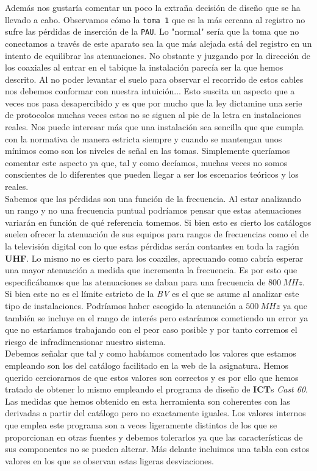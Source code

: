 \documentclass{article}[12 pt]
\begin{document}
			Además nos gustaría comentar un poco la extraña decisión de diseño que se ha llevado a cabo. Observamos cómo la \texttt{toma 1} que es la más cercana al registro no sufre las pérdidas de inserción de la \texttt{PAU}. Lo "normal" sería que la toma que no conectamos a través de este aparato sea la que más alejada está del registro en un intento de equilibrar las atenuaciones. No obstante y juzgando por la dirección de los coaxiales al entrar en el tabique la instalación parecía ser la que hemos descrito. Al no poder levantar el suelo para observar el recorrido de estos cables nos debemos conformar con nuestra intuición... Esto suscita un aspecto que a veces nos pasa desapercibido y es que por mucho que la ley dictamine una serie de protocolos muchas veces estos no se siguen al pie de la letra en instalaciones reales. Nos puede interesar más que una instalación sea sencilla que que cumpla con la normativa de manera estricta siempre y cuando se mantengan unos mínimos como son los niveles de señal en las tomas. Simplemente queríamos comentar este aspecto ya que, tal y como decíamos, muchas veces no somos conscientes de lo diferentes que pueden llegar a ser los escenarios teóricos y los reales.\\

			Sabemos que las pérdidas son una función de la frecuencia. Al estar analizando un rango y no una frecuencia puntual podríamos pensar que estas atenuaciones variarán en función de qué referencia tomemos. Si bien esto es cierto los catálogos suelen ofrecer la atenuación de sus equipos para rangos de frecuencias como el de la televisión digital con lo que estas pérdidas serán contantes en toda la ragión \textbf{UHF}. Lo mismo no es cierto para los coaxiles, aprecuando como cabría esperar una mayor atenuación a medida que incrementa la frecuencia. Es por esto que especificábamos que las atenuaciones se daban para una frecuencia de $800\ MHz$. Si bien este no es el límite estricto de la \textit{BV} es el que se asume al analizar este tipo de instalaciones. Podríamos haber escogido la atenuación a $500\ MHz$ ya que también se incluye en el rango de interés pero estaríamos cometiendo un error ya que no estaríamos trabajando con el peor caso posible y por tanto corremos el riesgo de infradimensionar nuestro sistema.\\

			Debemos señalar que tal y como habíamos comentado los valores que estamos empleando son los del catálogo facilitado en la web de la asignatura. Hemos querido cerciorarnos de que estos valores son correctos y es por ello que hemos tratado de obtener lo mismo empleando el programa de diseño de \textbf{ICT}s \textit{Cast 60}. Las medidas que hemos obtenido en esta herramienta son coherentes con las derivadas a partir del catálogo pero no exactamente iguales. Los valores internos que emplea este programa son a veces ligeramente distintos de los que se proporcionan en otras fuentes y debemos tolerarlos ya que las características de sus componentes no se pueden alterar. Más delante incluimos una tabla con estos valores en los que se observan estas ligeras desviaciones.\\
\end{document}
